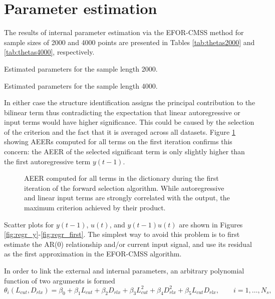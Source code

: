 \documentclass[a4paper,11pt,twoside]{article}
\theoremstyle{mytheoremstyle}
\begin{document}
\section{Parameter estimation}
\par The results of internal parameter estimation via the EFOR-CMSS method for sample sizes of 2000 and 4000 points are presented in Tables \ref{tab:thetas2000} and \ref{tab:thetas4000}, respectively.
\begin{table}[!h]
	\centering
	\caption{Estimated parameters for the sample length 2000.}\label{tab:thetas2000}
	\small
	
\end{table}
\begin{table}[!h]
	\centering
	\caption{Estimated parameters for the sample length 4000.}\label{tab:thetas4000}
	\small
	
\end{table}
In either case the structure identification assigns the principal contribution to the bilinear term thus contradicting the expectation that linear autoregressive or input terms would have higher significance. This could be caused by the selection of the criterion and the fact that it is averaged across all datasets. Figure \ref{fig:aeer} showing AEERs computed for all terms on the first iteration confirms this concern: the AEER of the selected significant term is only slightly higher than the first autoregressive term $y(t-1)$. 
\begin{figure}[!h]
	\centering
	
	\caption{AEER computed for all terms in the dictionary during the first iteration of the forward selection algorithm. While autoregressive and linear input terms are strongly correlated with the output, the maximum criterion achieved by their product.}\label{fig:aeer}
\end{figure}
Scatter plots for $y(t-1)$, $u(t)$, and $y(t-1)u(t)$ are shown in Figures \ref{fig:regr_y}-\ref{fig:regr_first}. The simplest way to avoid this problem is to first estimate the AR(0) relationship and/or current input signal, and use its residual as the first approximation in the EFOR-CMSS algorithm.
\par In order to link the external and internal parameters, an arbitrary polynomial function of two arguments is formed
\begin{equation}
\theta_i(L_{cut},D_{rlx}) = \beta_0 + \beta_1 L_{cut} + \beta_2 D_{rlx} + \beta_3 L_{cut}^{2} + \beta_4 D_{rlx}^{2} + \beta_5 L_{cut} D_{rlx}, \qquad i=1,\dots,N_s,
\end{equation}
\end{document}
